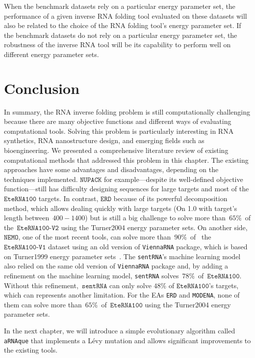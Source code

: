 When the benchmark datasets rely on a particular energy parameter set, the performance of a given inverse \ac{RNA} folding tool evaluated on these datasets will also be related to the choice of the \ac{RNA} folding tool's energy parameter set. If the benchmark datasets do not rely on a particular energy parameter set, the robustness of the inverse \ac{RNA} tool will be its capability to perform well on different energy parameter sets.

\section{Conclusion}
In summary, the \ac{RNA} inverse folding problem is still computationally challenging because there are many objective functions and different ways of evaluating computational tools. Solving this problem is particularly interesting in \ac{RNA} synthetics, \ac{RNA} nanostructure design, and emerging fields such as bioengineering. We presented a comprehensive literature review of existing computational methods that addressed this problem in this chapter. The existing approaches have some advantages and disadvantages, depending on the techniques implemented. \(\texttt{NUPACK}\) for example---despite its well-defined objective function---still has difficulty designing sequences for large targets and most of the \(\texttt{EteRNA100}\) targets. In contrast, \(\texttt{ERD}\) because of its powerful decomposition method, which allows dealing quickly with large targets (On  1.0 with target's length between~\(400-1400\)) but is still a big challenge to solve more than~\(65\%\)~of the~\(\texttt{EteRNA100-V2}\) using the Turner2004 energy parameter sets. On another side,~\(\texttt{NEMO}\), one of the most recent tools, can solve more than~\(90\%\)~of~ the \(\texttt{EteRNA100-V1}\) dataset using an old version of \texttt{ViennaRNA} package, which is based on Turner1999 energy parameter sets~\cite{Turn1999}. The \texttt{sentRNA}'s machine learning model also relied on the same old version of \texttt{ViennaRNA} package and, by adding a refinement on the machine learning model, \texttt{sentRNA} solves~\(78\%\)~of~\(\texttt{EteRNA100}\). Without this refinement,~\(\texttt{sentRNA}\) can only solve \(48\%\) of \(\texttt{EteRNA100}\)'s targets, which can represents another limitation. For the EAs \texttt{ERD} and \texttt{MODENA}, none of them can solve more than~\(65\%\)~of~\(\texttt{EteRNA100}\) using the Turner2004 energy parameter sets.  

In the next chapter, we will introduce a simple evolutionary algorithm called \texttt{aRNAque} that implements a Lévy mutation and allows significant improvements to the existing tools.
